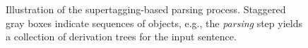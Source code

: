 \documentclass[../document.tex]{subfiles}
\begin{document}
    \begin{figure}
        
        \caption{\label{fig:parsing:overview}
            Illustration of the supertagging-based parsing process.
            Staggered gray boxes indicate sequences of objects, e.g.\@, the \emph{parsing} step yields a collection of derivation trees for the input sentence.
        }
    \end{figure}


    
    

    \ifSubfilesClassLoaded{%
        \printindex
    }{}
\end{document}
